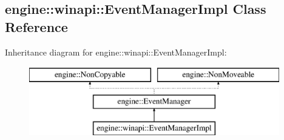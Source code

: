 \hypertarget{a00035}{}\subsection{engine\+:\+:winapi\+:\+:Event\+Manager\+Impl Class Reference}
\label{a00035}
Inheritance diagram for engine\+:\+:winapi\+:\+:Event\+Manager\+Impl\+:\begin{figure}[H]
\begin{center}
\leavevmode
\includegraphics[height=3.000000cm]{a00035}
\end{center}
\end{figure}
